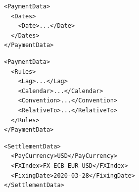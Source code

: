 \begin{listing}[H]
\begin{verbatim}
<PaymentData>
  <Dates>
    <Date>...</Date>
  </Dates>
</PaymentData>
\end{verbatim}
\caption{Dates based \lstinline!PaymentData!}
\label{lst:dates_payment_data}
\end{listing}

\begin{listing}[H]
\begin{verbatim}
<PaymentData>
  <Rules>
    <Lag>...</Lag>
    <Calendar>...</Calendar>
    <Convention>...</Convention>
    <RelativeTo>...</RelativeTo>
  </Rules>
</PaymentData>
\end{verbatim}
\caption{Rules based \lstinline!PaymentData!}
\label{lst:rules_payment_data}
\end{listing}

\begin{listing}[H]
\begin{verbatim}
<SettlementData>
  <PayCurrency>USD</PayCurrency>
  <FXIndex>FX-ECB-EUR-USD</FXIndex>
  <FixingDate>2020-03-28</FixingDate>
</SettlementData>
\end{verbatim}
\caption{SettlementData node for cash settled options}
\label{lst:settlement_data_cash_settled_options}
\end{listing}
